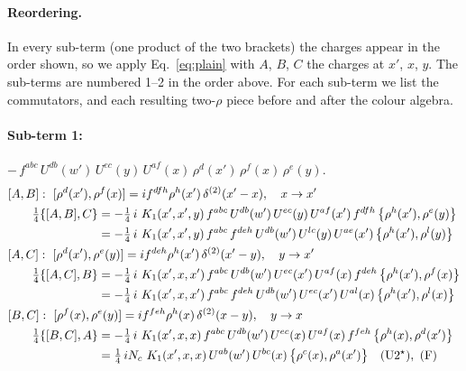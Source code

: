 \documentclass[10pt]{article}
\numberwithin{equation}{section}
\begin{document}
\paragraph{Reordering.} In every sub-term (one product of the two brackets) the charges appear in the order shown, so we apply Eq.~\eqref{eq:plain} with $A$, $B$, $C$ the charges at $x'$, $x$, $y$. The sub-terms are numbered 1--2 in the order above. For each sub-term we list the commutators, and each resulting two-$\rho$ piece before and after the colour algebra.
\paragraph{Sub-term 1:} $-\,f^{abc}\,U^{db}(w')\,U^{ec}(y)\,U^{af}(x)\,\rho^{d}(x')\,\rho^{f}(x)\,\rho^{e}(y)$.
\begin{align}
&[A,B]:\ [\rho^{d}(x'),\rho^{f}(x)]=i f^{dfh}\rho^{h}(x')\,\delta^{(2)}(x'-x),\quad x\to x'\notag\\
&\qquad \tfrac14\{[A,B],C\}=-\tfrac14\,i\,\,K_1(x',x',y)\,f^{abc}\,U^{db}(w')\,U^{ec}(y)\,U^{af}(x')\,f^{dfh}\,\big\{\rho^{h}(x'),\rho^{e}(y)\big\}\notag\\
&\qquad\phantom{\tfrac14\{[A,B],C\}}=-\tfrac14\,i\,\,K_1(x',x',y)\,f^{abc}\,f^{deh}\,U^{db}(w')\,U^{lc}(y)\,U^{ae}(x')\,\big\{\rho^{h}(x'),\rho^{l}(y)\big\}
\label{eq:B1-1-AB}\\
&[A,C]:\ [\rho^{d}(x'),\rho^{e}(y)]=i f^{deh}\rho^{h}(x')\,\delta^{(2)}(x'-y),\quad y\to x'\notag\\
&\qquad \tfrac14\{[A,C],B\}=-\tfrac14\,i\,\,K_1(x',x,x')\,f^{abc}\,U^{db}(w')\,U^{ec}(x')\,U^{af}(x)\,f^{deh}\,\big\{\rho^{h}(x'),\rho^{f}(x)\big\}\notag\\
&\qquad\phantom{\tfrac14\{[A,C],B\}}=-\tfrac14\,i\,\,K_1(x',x,x')\,f^{abc}\,f^{deh}\,U^{db}(w')\,U^{ec}(x')\,U^{al}(x)\,\big\{\rho^{h}(x'),\rho^{l}(x)\big\}
\label{eq:B1-1-AC}\\
&[B,C]:\ [\rho^{f}(x),\rho^{e}(y)]=i f^{feh}\rho^{h}(x)\,\delta^{(2)}(x-y),\quad y\to x\notag\\
&\qquad \tfrac14\{[B,C],A\}=-\tfrac14\,i\,\,K_1(x',x,x)\,f^{abc}\,U^{db}(w')\,U^{ec}(x)\,U^{af}(x)\,f^{feh}\,\big\{\rho^{h}(x),\rho^{d}(x')\big\}\notag\\
&\qquad\phantom{\tfrac14\{[B,C],A\}}=\tfrac14\,i N_{c}\,\,K_1(x',x,x)\,U^{ab}(w')\,U^{bc}(x)\,\big\{\rho^{c}(x),\rho^{a}(x')\big\}\quad\text{(U2$^\star$)},\ \text{(F)}
\label{eq:B1-1-BC}
\end{align}
\end{document}

